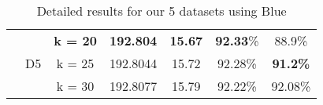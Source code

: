 \begin{table}
\begin{tabular}{ |c|c|c|c|c|c|c| }
\\\cline{2-7}
                &  & \textbf{k = 20} & \textbf{192.804} & \textbf{15.67} & \textbf{92.33}\% & 88.9\% \\   
               & D5 & k = 25 & 192.8044 & 15.72 & 92.28\% & \textbf{91.2\%} 
\\               
                &  & k = 30 & 192.8077 & 15.79 & 92.22\%  & 92.08\%
\\           
  \hline
  \end{tabular}
\caption {Detailed results for our 5 datasets using Blue}
\label{tb1:Blue-Perplexity-vs-Alignment}
\end{table}


